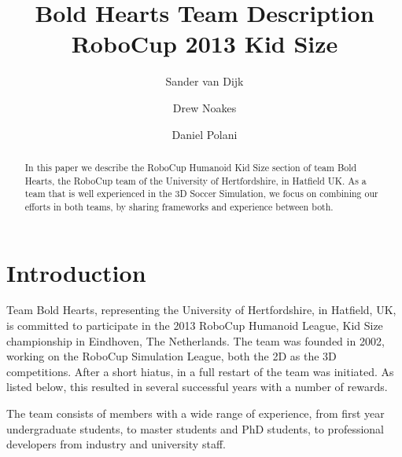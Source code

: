 \documentclass{llncs}
\title{Bold Hearts Team Description\\RoboCup 2013 Kid Size}
\author{Sander van Dijk \and Drew Noakes \and Daniel Polani}
\institute{Adaptive Systems Research Group\\School of Computer Science\\University of Hertfordshire, UK}
\begin{document}
\maketitle

%
%

\begin{abstract}
  In this paper we describe the RoboCup Humanoid Kid Size section of
  team Bold Hearts, the RoboCup team of the University of
  Hertfordshire, in Hatfield UK. As a team that is well experienced in
  the 3D Soccer Simulation, we focus on combining our efforts in both
  teams, by sharing frameworks and experience between both. 
\end{abstract}

\section{Introduction}
\label{sec:introduction}

Team Bold Hearts, representing the University of Hertfordshire, in
Hatfield, UK, is committed to participate in the 2013 RoboCup Humanoid
League, Kid Size championship in Eindhoven, The Netherlands. The team
was founded in 2002, working on the RoboCup Simulation League, both
the 2D as the 3D competitions. After a short hiatus, in a full restart
of the team was initiated. As listed below, this resulted in several
successful years with a number of rewards.

The team consists of members with a wide range of experience, from
first year undergraduate students, to master students and PhD
students, to professional developers from industry and university
staff.
\end{document}
